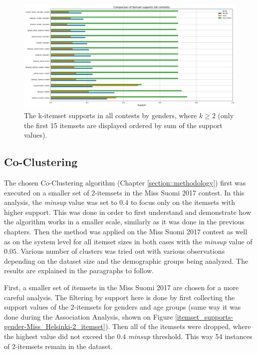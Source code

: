 \begin{figure}[h] 
    \begin{center}
        \includegraphics[width=1.0\textwidth]{Images/itemset_supports-gender-all_contests-over2_itemset.png}
        \caption{The k-itemset supports in all contests by genders, where $k \geq 2$ (only the first 15 itemsets are displayed ordered by sum of the support values).}
        \label{itemset_supports-gender-all_contests-over2_itemset}
    \end{center}
\end{figure}

\subsection{Co-Clustering}
The chosen Co-Clustering algorithm (Chapter \ref{section::methodology}) first was executed on a smaller set of 2-itemsets in the Miss Suomi 2017 contest. In this analysis, the \emph{minsup} value was set to $0.4$ to focus only on the itemsets with higher support. This was done in order to first understand and demonstrate how the algorithm works in a smaller scale, similarly as it was done in the previous chapters. Then the method was applied on the Miss Suomi 2017 contest as well as on the system level for all itemset sizes in both cases with the \emph{minsup} value of $0.05$. Various number of clusters was tried out with various observations depending on the dataset size and the demographic groups being analyzed. The results are explained in the paragraphs to follow. 

First, a smaller set of itemsets in the Miss Suomi 2017 are chosen for a more careful analysis. The filtering by support here is done by first collecting the support values of the 2-itemsets for genders and age groups (same way it was done during the Association Analysis, shown on Figure \ref{itemset_supports-gender-Miss_Helsinki-2_itemset}). Then all of the itemsets were dropped, where the highest value did not exceed the $0.4$ \emph{minsup} threshold. This way 54 instances of 2-itemsets remain in the dataset.

